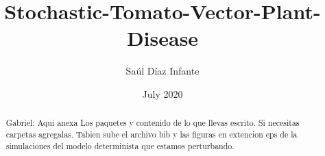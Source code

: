 \documentclass{article}
\title{Stochastic-Tomato-Vector-Plant-Disease}
\author{Saúl Díaz Infante}
\date{July 2020}
\begin{document}
\maketitle

\begin{abstract}
Gabriel:
Aqui anexa Los paquetes y contenido de lo que llevas escrito.
Si necesitas carpetas agregalas.
Tabien sube el archivo bib y las figuras en extencion eps de 
la simulaciones del modelo determinista que estamos perturbando.
\end{abstract}





\end{document}
